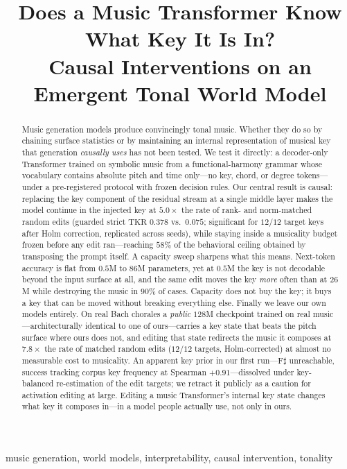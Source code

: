 \documentclass[conference]{IEEEtran}
\title{Does a Music Transformer Know What Key It Is In?\\
Causal Interventions on an Emergent Tonal World Model}
\makeatletter
\newcommand{\ninept}{}
\newenvironment{keywords}{\begin{IEEEkeywords}}{\end{IEEEkeywords}}
\newcommand{\tkr}{\mathrm{TKR}}
\newcommand{\vs}{vs.\@\ }
\makeatother
\begin{document}
\ninept
\maketitle

\begin{abstract}
Music generation models produce convincingly tonal music. Whether they do so by
chaining surface statistics or by maintaining an internal representation of
musical key that generation \emph{causally uses} has not been tested. We test it
directly: a decoder-only Transformer trained on symbolic music from a
functional-harmony grammar whose vocabulary contains absolute pitch and time
only---no key, chord, or degree tokens---under a pre-registered protocol with
frozen decision rules. Our central result is causal: replacing the key component
of the residual stream at a single middle layer makes the model continue in the
injected key at $5.0\times$ the rate of rank- and norm-matched random edits
(guarded strict $\tkr$ $0.378$ \vs $0.075$; significant for $12/12$ target keys
after Holm correction, replicated across seeds), while staying inside a
musicality budget frozen before any edit ran---reaching $58\%$ of the behavioral
ceiling obtained by transposing the prompt itself. A capacity sweep sharpens what
this means. Next-token accuracy is flat from $0.5$M to $86$M parameters, yet at
$0.5$M the key is not decodable beyond the input surface at all, and the same
edit moves the key \emph{more} often than at $26$M while destroying the music in
$90\%$ of cases. Capacity does not buy the key; it buys a key that can be moved
without breaking everything else. Finally we leave our own models entirely. On real Bach
chorales a \emph{public} $128$M checkpoint trained on real music---architecturally
identical to one of ours---carries a key state that beats the pitch surface where ours
does not, and editing that state redirects the music it composes at $7.8\times$ the rate
of matched random edits ($12/12$ targets, Holm-corrected) at almost no measurable cost
to musicality. An apparent key prior in our first run---F$\sharp$ unreachable, success
tracking corpus key frequency at Spearman $+0.91$---dissolved under key-balanced
re-estimation of the edit targets; we retract it publicly as a caution for activation
editing at large. Editing a music Transformer's internal key state changes what key it
composes in---in a model people actually use, not only in ours.
\end{abstract}

\begin{keywords}
music generation, world models, interpretability, causal intervention, tonality
\end{keywords}
\end{document}
